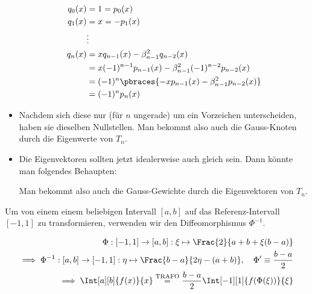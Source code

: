 \begin{solution}
\begin{itemize}
  \begin{align*}
    q_0(x) & = 1 = p_0(x) \\
    q_1(x) & = x = -p_1(x) \\
    & \vdots \\
    q_n(x)
    & =
    x q_{n-1}(x) - \beta_{n-1}^2 q_{n-2}(x) \\
    & =
    x (-1)^{n-1} p_{n-1}(x) - \beta_{n-1}^2 (-1)^{n-2} p_{n-2}(x) \\
    & =
    (-1)^n \pbraces
    {
      -x p_{n-1}(x) - \beta_{n-1}^2 p_{n-2}(x)
    } \\
    & =
    (-1)^n p_n(x)
  \end{align*}

  \item Nachdem sich diese nur (für $n$ ungerade) um ein Vorzeichen unterscheiden, haben sie dieselben Nullstellen.
  Man bekommt also auch die Gauss-Knoten durch die Eigenwerte von $T_n$.

  \item Die Eigenvektoren sollten jetzt idealerweise auch gleich sein.
  Dann könnte man folgendes Behaupten:

  Man bekommt also auch die Gauss-Gewichte durch die Eigenvektoren von $T_n$.

\end{itemize}

Um von einem einem beliebigen Intervall $[a, b]$ auf das Referenz-Intervall $[-1, 1]$ zu transformieren, verwenden wir den Diffeomorphismus $\Phi^{-1}$.

\begin{align*}
  \Phi:
  [-1, 1] \to [a, b]:
  \xi \mapsto \Frac{2}{a + b + \xi (b - a)} \\
  \implies
  \Phi^{-1}:
  [a, b] \to [-1, 1]:
  \eta \mapsto \Frac{b-a}{2 \eta - (a + b)},
  \quad
  \Phi^\prime \equiv \frac{b - a}{2} \\
  \implies
  \Int[a][b]{f(x)}{x}
  \stackrel{\text{TRAFO}}{=}
  \frac{b - a}{2}
  \Int[-1][1]{f(\Phi(\xi))}{\xi}
\end{align*}

\end{solution}

